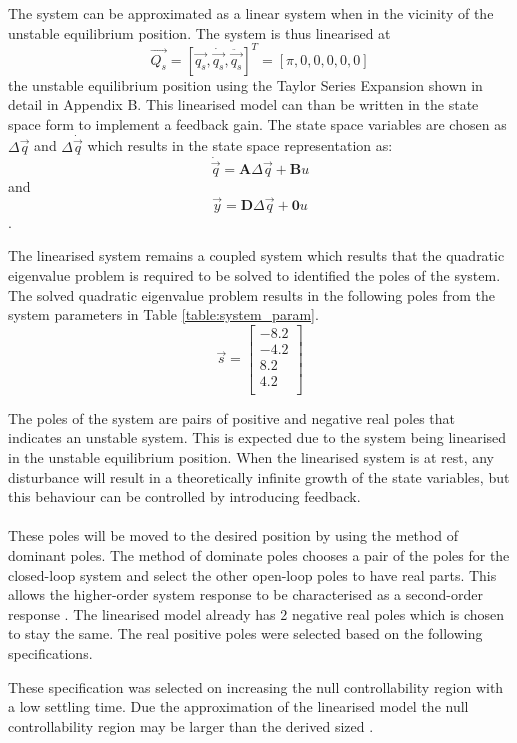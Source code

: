 \documentclass[a4paper,12pt]{article}
\begin{document}
	The system can be approximated as a linear system when in the vicinity of the unstable equilibrium position. The system is thus linearised at $$\vec{Q_{s}} = [\vec{q_{s}},\dot{\vec{q_{s}}},\ddot{\vec{q_{s}}}]^{T}=[\pi,0,0,0,0,0]$$ the unstable equilibrium position using the Taylor Series Expansion shown in detail in Appendix B. This linearised model can than be written in the state space form to implement a feedback gain. The state space variables are chosen as $\Delta{\vec{q}}$ and $\Delta{\dot{\vec{q}}}$ which results in the state space representation as:  $$ \dot{\vec{q}} = \boldsymbol{A}\Delta{\vec{q}} + \boldsymbol{B}u $$ and $$ \vec{y} = \boldsymbol{D}\Delta{\vec{q}} + \boldsymbol{0}u $$.
	
	The linearised system remains a coupled system which results that the quadratic eigenvalue problem is required to be solved to identified the poles of the system. The solved quadratic eigenvalue problem results in the following poles from the system parameters in Table \ref{table:system_param}.
	$$
	\vec{s} = 
	\begin{bmatrix}
		-8.2 \\
		-4.2	\\
		8.2 \\
		4.2 \\
		
	\end{bmatrix}
	$$
	
	The poles of the system are pairs of positive and negative real poles that indicates an unstable system. This is expected due to the system being linearised in the unstable equilibrium position. When the linearised system is at rest, any disturbance will result in a theoretically infinite growth of the state variables, but this behaviour can be controlled by introducing feedback. \\
	\\
	These poles will be moved to the desired position by using the method of dominant poles. The method of dominate poles chooses a pair of the poles for the closed-loop system and select the other open-loop poles to have real parts. This allows the higher-order system response to be characterised as a second-order response \cite{textbook}. The linearised model already has 2 negative real poles which is chosen to stay the same. The real positive poles were selected based on the following specifications.
	
	These specification was selected on increasing the null controllability region with a low settling time. Due the approximation of the linearised model the null controllability region may be larger than the derived sized \cite{simple_null_controllability}. 
	
\end{document}
